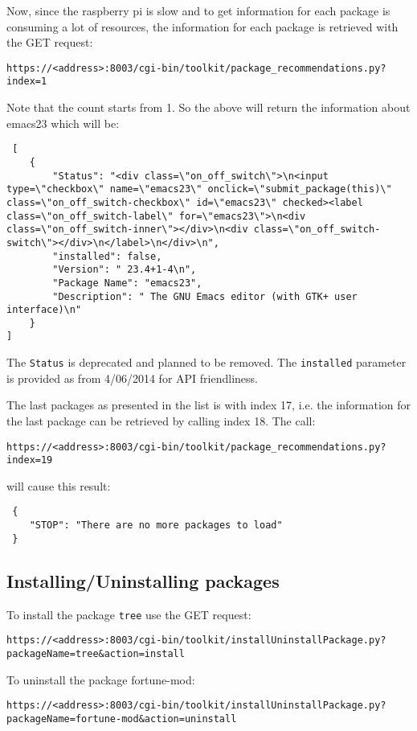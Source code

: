 \documentclass[12pt]{article}
\begin{document}
  Now, since the raspberry pi is slow and to get information for each package is consuming a lot of resources, the information for each package is retrieved with the GET request:
 
 
 \texttt{https://<address>:8003/cgi-bin/toolkit/package\_recommendations.py?index=1} 

Note that the count starts from 1. So the above will return the information about emacs23 which will be:
 
 \begin{verbatim}
 [
    {
        "Status": "<div class=\"on_off_switch\">\n<input type=\"checkbox\" name=\"emacs23\" onclick=\"submit_package(this)\" class=\"on_off_switch-checkbox\" id=\"emacs23\" checked><label class=\"on_off_switch-label\" for=\"emacs23\">\n<div class=\"on_off_switch-inner\"></div>\n<div class=\"on_off_switch-switch\"></div>\n</label>\n</div>\n",
        "installed": false,
        "Version": " 23.4+1-4\n",
        "Package Name": "emacs23",
        "Description": " The GNU Emacs editor (with GTK+ user interface)\n"
    }
]
 \end{verbatim}
 
 The \texttt{Status} is deprecated and planned to be removed. The \texttt{installed} parameter is provided as from 4/06/2014 for API friendliness.
 
 The last packages as presented in the list is with index 17, i.e. the information for the last package can be retrieved by calling index 18. The call:
 
 
 \texttt{https://<address>:8003/cgi-bin/toolkit/package\_recommendations.py?index=19}
 
 will cause this result:
 
 \begin{verbatim}
 {
    "STOP": "There are no more packages to load"
 }
 \end{verbatim}
 
 \subsection{Installing/Uninstalling packages}
 To install the package \texttt{tree} use the GET request:

 \texttt{https://<address>:8003/cgi-bin/toolkit/installUninstallPackage.py?\\
 packageName=tree&action=install}
 
 To uninstall the package fortune-mod:
 
 
 \texttt{https://<address>:8003/cgi-bin/toolkit/installUninstallPackage.py?\\
 packageName=fortune-mod\&action=uninstall}
 
\end{document}
